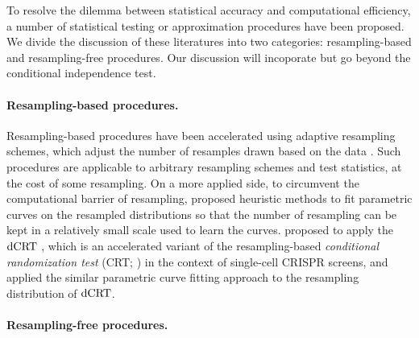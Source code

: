 \documentclass[12pt]{article}
\theoremstyle{definition}
\newcommand{\dCRT}{\textnormal{dCRT}} 					%
\begin{document}
To resolve the dilemma between statistical accuracy and computational efficiency, a number of statistical testing or approximation procedures have been proposed. We divide the discussion of these literatures into two categories: resampling-based and resampling-free procedures. Our discussion will incoporate but go beyond the conditional independence test.

\paragraph{Resampling-based procedures.}


Resampling-based procedures have been accelerated using adaptive resampling schemes, which adjust the number of resamples drawn based on the data \citep{Besag1991,Gandy2009,Gandy2014,Gandy2016,Gandy2017a,Fischer2024a,Fischer2024}. Such procedures are applicable to arbitrary resampling schemes and test statistics, at the cost of some resampling. On a more applied side, to circumvent the computational barrier of resampling, \citet{Ge2012,Winkler2016} proposed heuristic methods to fit parametric curves on the resampled distributions so that the number of resampling can be kept in a relatively small scale used to learn the curves. \citep{Katsevich2020c} proposed to apply the $\dCRT$ \citep{Liu2022a}, which is an accelerated variant of the resampling-based \textit{conditional randomization test} (CRT; \cite{CetL16}) in the context of single-cell CRISPR screens, and applied the similar parametric curve fitting approach to the resampling distribution of $\dCRT$. 

\paragraph{Resampling-free procedures.}
\end{document}
